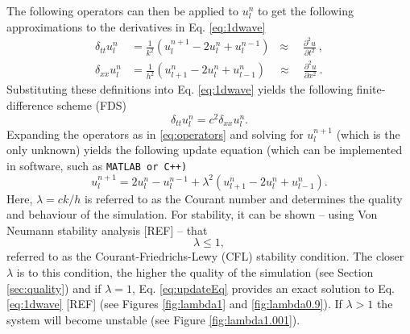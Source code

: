 \documentclass[dvipsnames, reprint]{JASA}
\def\SWcomment[#1]{\textcolor{Bittersweet}{#1}}
\begin{document}
The following operators can then be applied to $u_l^n$ to get the following approximations to the derivatives in Eq. \eqref{eq:1dwave}
\begin{subequations}\label{eq:operators}
    \begin{align}
         \delta_{tt}u_l^n &= \frac{1}{k^2}\left(u_l^{n+1}-2u_l^n + u_l^{n-1}\right)\;\;\approx\quad\frac{\partial^2u}{\partial t^2}\label{eq:secondOrderTime}\ ,\\
         \delta_{xx}u_l^n &= \frac{1}{h^2}\left(u_{l+1}^n-2u_l^n + u_{l-1}^n\right)\quad\approx\quad \frac{\partial^2u}{\partial x^2}\ .\label{eq:secondOrderSpace}
    \end{align}
\end{subequations}
Substituting these definitions into Eq. \eqref{eq:1dwave} yields the following finite-difference scheme (FDS)
\begin{equation}\label{eq:FDS}
    \delta_{tt}u_l^n = c^2 \delta_{xx}u_l^n.
\end{equation}
Expanding the operators as in %
\eqref{eq:operators} and solving for $u_l^{n+1}$ (which is the only unknown) yields the following update equation \SWcomment[(which can be implemented in software, such as {\tt MATLAB} or {\tt C++})]
\begin{equation}\label{eq:updateEq}
    u_l^{n+1} = 2u_l^n-u_l^{n-1} + \lambda^2 \left(u_{l+1}^n-2u_l^n + u_{l-1}^n\right).
\end{equation}
Here, $\lambda = ck/h$ is referred to as the Courant number and determines the quality and behaviour of the simulation. For stability, it can be shown -- using Von Neumann stability analysis [REF] -- that \begin{equation}\label{eq:CFL}
    \lambda \leq 1,
\end{equation}
referred to as the Courant-Friedrichs-Lewy (CFL) stability condition. The closer $\lambda$ is to this condition, the higher the quality of the simulation (see Section \ref{sec:quality}) and if $\lambda = 1$, Eq. \eqref{eq:updateEq} provides an exact solution to Eq. \eqref{eq:1dwave} %
[REF] (see Figures \ref{fig:lambda1} and \ref{fig:lambda0.9}). If $\lambda > 1$ the system will become unstable (see Figure \ref{fig:lambda1.001}).
\begin{figure}
\end{figure}
\end{document}
